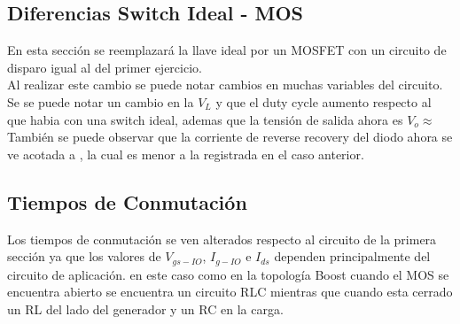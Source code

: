 



\subsection{Diferencias Switch Ideal - MOS}
En esta sección se reemplazará la llave ideal por un MOSFET con un circuito de disparo igual al del primer ejercicio.\\
Al realizar este cambio se puede notar cambios en muchas variables del circuito.
Se  se puede notar un cambio en la $V_L$ y que el duty cycle aumento respecto al que habia con una switch ideal, ademas que la tensión de salida ahora es $V_o \approx$
También se puede observar que la corriente de reverse recovery del diodo ahora se ve acotada a , la cual es menor a la registrada en el caso anterior.

\subsection{Tiempos de Conmutación}
Los tiempos de conmutación se ven alterados respecto al circuito de la primera sección ya que los valores de $V_{gs-IO}$, $I_{g-IO}$ e $I_{ds}$ dependen principalmente del circuito de aplicación.
en este caso como en la topología Boost cuando el MOS se encuentra abierto se encuentra un circuito RLC mientras que cuando esta cerrado un RL del lado del generador y un RC en la carga.

